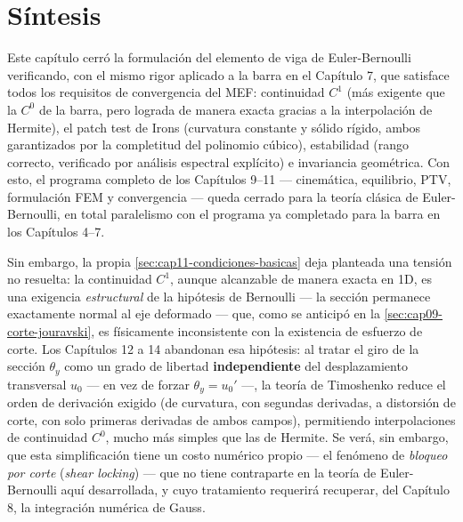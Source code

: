 \section{Síntesis}

Este capítulo cerró la formulación del elemento de viga de Euler-Bernoulli verificando, con el mismo rigor aplicado a la barra en el Capítulo 7, que satisface todos los requisitos de convergencia del MEF: continuidad $C^1$ (más exigente que la $C^0$ de la barra, pero lograda de manera exacta gracias a la interpolación de Hermite), el patch test de Irons (curvatura constante y sólido rígido, ambos garantizados por la completitud del polinomio cúbico), estabilidad (rango correcto, verificado por análisis espectral explícito) e invariancia geométrica. Con esto, el programa completo de los Capítulos 9--11 --- cinemática, equilibrio, PTV, formulación FEM y convergencia --- queda cerrado para la teoría clásica de Euler-Bernoulli, en total paralelismo con el programa ya completado para la barra en los Capítulos 4--7.

Sin embargo, la propia \cref{sec:cap11-condiciones-basicas} deja planteada una tensión no resuelta: la continuidad $C^1$, aunque alcanzable de manera exacta en 1D, es una exigencia \emph{estructural} de la hipótesis de Bernoulli --- la sección permanece exactamente normal al eje deformado --- que, como se anticipó en la \cref{sec:cap09-corte-jouravski}, es físicamente inconsistente con la existencia de esfuerzo de corte. Los Capítulos 12 a 14 abandonan esa hipótesis: al tratar el giro de la sección $\theta_y$ como un grado de libertad \textbf{independiente} del desplazamiento transversal $u_0$ --- en vez de forzar $\theta_y=u_0'$ ---, la teoría de Timoshenko reduce el orden de derivación exigido (de curvatura, con segundas derivadas, a distorsión de corte, con solo primeras derivadas de ambos campos), permitiendo interpolaciones de continuidad $C^0$, mucho más simples que las de Hermite. Se verá, sin embargo, que esta simplificación tiene un costo numérico propio --- el fenómeno de \emph{bloqueo por corte} (\emph{shear locking}) --- que no tiene contraparte en la teoría de Euler-Bernoulli aquí desarrollada, y cuyo tratamiento requerirá recuperar, del Capítulo 8, la integración numérica de Gauss.
